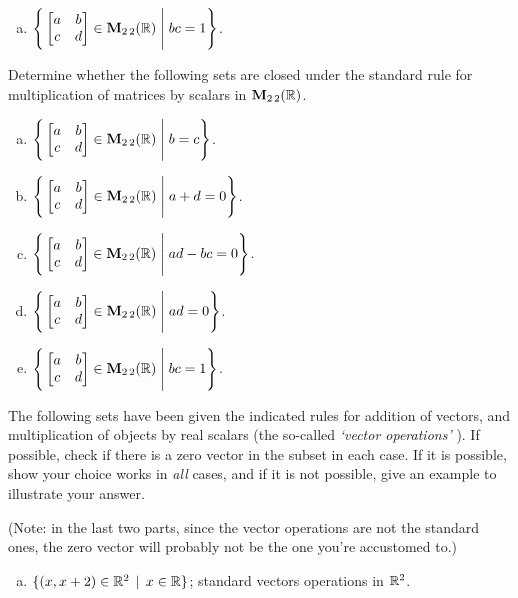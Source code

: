 \begin{prob}
\begin{enumerate}[a)]
\item  $\Bigg\{  \bmatrix a&b\\ c&d\endbmatrix \in \M_{2 \,2}(\R) \;\Bigg|\; bc=1\Bigg\}$.      \medskip
%

\end{enumerate}

\end{prob} \begin{prob} \label{prob04.6} Determine whether the following sets are closed under the standard rule for multiplication of matrices by scalars in $\mathbf{M}_{2 \,2}(\mathbb{R})$. 
\begin{enumerate}[a)]\medskip


\item  $\Bigg\{  \bmatrix a&b\\ c&d\endbmatrix \in \M_{2 \,2}(\R) \;\Bigg|\; b=c\Bigg\}$.\medskip \medskip
%

\item\sov  $\Bigg\{  \bmatrix a&b\\ c&d\endbmatrix \in \M_{2 \,2}(\R) \;\Bigg|\; a+d=0\Bigg\}$. \medskip
%

\item  $\Bigg\{  \bmatrix a&b\\ c&d\endbmatrix \in \M_{2 \,2}(\R) \;\Bigg|\; ad-bc=0\Bigg\}$. \medskip
%


\item\sov  $\Bigg\{  \bmatrix a&b\\ c&d\endbmatrix \in \M_{2 \,2}(\R) \;\Bigg|\; ad=0\Bigg\}$.      \medskip
%
\item  $\Bigg\{  \bmatrix a&b\\ c&d\endbmatrix \in \M_{2 \,2}(\R) \;\Bigg|\; bc=1\Bigg\}$.      \medskip
%
\end{enumerate}

 

\end{prob} \begin{prob} \label{prob04.7} The following sets have been given the indicated rules for addition of vectors,  and multiplication of objects  by real scalars (the so-called  {\it `vector operations' }). If possible, check if there is a zero vector in the subset in each case. If it is possible, show your choice works in {\it all } cases, and if it is not possible, give an example to illustrate your answer. 

(Note: in the last two parts, since the vector operations are not the standard ones, the zero vector will probably not be the one you're accustomed to.)
\begin{enumerate}[a)]
\medskip
\item  $\{(x, x+2) \in \mathbb{R}^2\,\mid \, x\in \mathbb{R} \}$; standard  vectors operations in $\mathbb{R}^2$. \medskip


\end{enumerate}
\end{prob}
